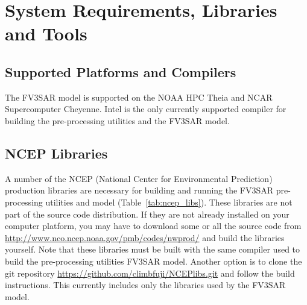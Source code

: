 \section{System Requirements, Libraries and Tools}

\subsection{Supported Platforms and Compilers}

The FV3SAR model is supported on the NOAA HPC Theia and NCAR Supercomputer Cheyenne.  Intel is the only
currently supported compiler for building the pre-processing utilities and the FV3SAR model.

\subsection{NCEP Libraries}

A number of the NCEP (National Center for Environmental Prediction) production libraries are necessary
for building and running the FV3SAR pre-processing utilities and model (Table~\ref{tab:ncep_libs}).
These libraries are not part of the source code distribution.
If they are not already installed on your computer platform, you may have to download some or all the
source code from \url{http://www.nco.ncep.noaa.gov/pmb/codes/nwprod/} and build the libraries yourself.
Note that these libraries must be built with the same compiler used to build the pre-processing utilities
FV3SAR model.
Another option is to clone the git repository \url{https://github.com/climbfuji/NCEPlibs.git} and follow
the build instructions.  This currently includes only the libraries used by the FV3SAR model.

